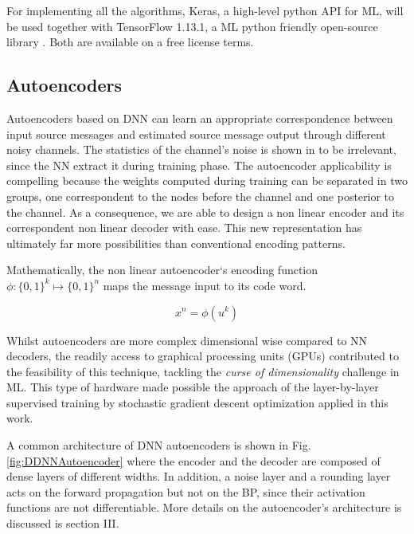 \documentclass[conference]{IEEEtran}
\begin{document}
For implementing all the algorithms, Keras, a high-level python API for ML, will be used together with TensorFlow 1.13.1, a ML python friendly open-source library \cite{DBLP:journals/corr/AbadiABBCCCDDDG16} \cite{chollet2015keras}. Both are available on a free license terms.




\subsection{Autoencoders}

Autoencoders based on DNN can learn an appropriate correspondence between input source messages and estimated source message output through different noisy channels. The statistics of the channel's noise is shown in \cite{2017arXiv171008379G} to be irrelevant, since the NN extract it during training phase. The autoencoder applicability is compelling because the weights computed during training can be separated in two groups, one correspondent to the nodes before the channel and one posterior to the channel. As a consequence, we are able to design a non linear encoder and its correspondent non linear decoder with ease. This new representation has ultimately far more possibilities than conventional encoding patterns.

Mathematically, the non linear autoencoder`s encoding function $\phi: \{0,1\}^k \mapsto \{0,1\}^n $ maps the message input to its code word. 

\begin{equation}
x^n = \phi (u^k)
\end{equation} 

Whilst autoencoders are more complex dimensional wise compared to NN decoders, the readily access to graphical processing units (GPUs) contributed to the feasibility of this technique, tackling the \textit{curse of dimensionality} challenge in ML. This type of hardware made possible the approach of the layer-by-layer supervised training by stochastic gradient descent optimization applied in this work. \cite{doi:10.1162/neco.2006.18.7.1527}

A common architecture of DNN autoencoders is shown in Fig. \ref{fig:DDNNAutoencoder} where the encoder and the decoder are composed of dense layers of different widths. In addition, a noise layer and a rounding layer acts on the forward propagation but not on the BP, since their activation functions are not differentiable. More details on the autoencoder's architecture is discussed is section III.  
\end{document}
